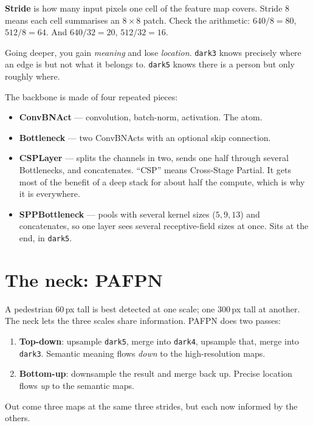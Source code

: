 \documentclass[../main.tex]{subfiles}
\begin{document}
\textbf{Stride} is how many input pixels one cell of the feature map covers. Stride 8 means each
cell summarises an $8\times8$ patch. Check the arithmetic: $640/8=80$, $512/8=64$. And
$640/32=20$, $512/32=16$.

Going deeper, you gain \emph{meaning} and lose \emph{location}. \texttt{dark3} knows precisely
where an edge is but not what it belongs to. \texttt{dark5} knows there is a person but only
roughly where.

The backbone is made of four repeated pieces:
\begin{itemize}
  \item \textbf{ConvBNAct} --- convolution, batch-norm, activation. The atom.
  \item \textbf{Bottleneck} --- two ConvBNActs with an optional skip connection.
  \item \textbf{CSPLayer} --- splits the channels in two, sends one half through several
        Bottlenecks, and concatenates. ``CSP'' means Cross-Stage Partial. It gets most of the
        benefit of a deep stack for about half the compute, which is why it is everywhere.
  \item \textbf{SPPBottleneck} --- pools with several kernel sizes ($5,9,13$) and concatenates,
        so one layer sees several receptive-field sizes at once. Sits at the end, in
        \texttt{dark5}.
\end{itemize}

\section{The neck: PAFPN}

A pedestrian 60\,px tall is best detected at one scale; one 300\,px tall at another. The neck
lets the three scales share information. PAFPN does two passes:

\begin{enumerate}
  \item \textbf{Top-down}: upsample \texttt{dark5}, merge into \texttt{dark4}, upsample that,
        merge into \texttt{dark3}. Semantic meaning flows \emph{down} to the high-resolution maps.
  \item \textbf{Bottom-up}: downsample the result and merge back up. Precise location flows
        \emph{up} to the semantic maps.
\end{enumerate}

Out come three maps at the same three strides, but each now informed by the others.
\end{document}
